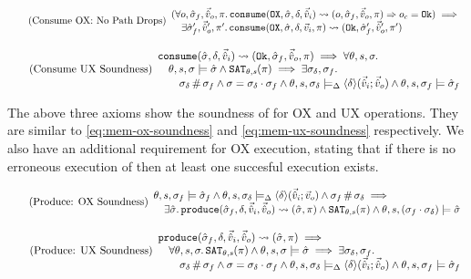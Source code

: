 \begin{equation}
\tag{Consume OX: No Path Drops}\label{eq:consume-ox-no-drop}
\begin{array}{l}
(\forall o, \hat{\sigma}_f,\vec{\hat{v}}_o,\pi \ldotp \texttt{consume}(\texttt{OX},\hat{\sigma},\delta,\vec{\hat{v}}_i)\rightsquigarrow (o, \hat{\sigma}_f, \vec{\hat{v}}_o, \pi)\Rightarrow o_c = \texttt{Ok}) \implies \\
\quad \exists  \hat{\sigma}_f',\vec{\hat{v}}_o',\pi' \ldotp \texttt{consume}(\texttt{OX}, \hat{\sigma}, \delta,\vec{v}_i,\pi)\rightsquigarrow (\texttt{Ok}, \hat{\sigma}_f', \vec{\hat{v}}_o', \pi')
\end{array}
\end{equation}

\begin{equation}
\tag{Consume UX Soundness}\label{eq:consume-ux-sound}
\begin{array}{l}
\texttt{consume}(\hat{\sigma},\delta,\vec{\hat{v}}_i)\rightsquigarrow (\texttt{Ok},\hat{\sigma}_f,\vec{\hat{v}}_o,\pi) \implies \forall \theta,s,\sigma\ldotp \\
\quad  \theta,s,\sigma\models \hat{\sigma} \land \texttt{SAT}_{\mathit{\theta,s}}(\pi) \implies \exists \sigma_\delta, \sigma_f\ldotp\\
\qquad \sigma_\delta\operatorname{\#}\sigma_f \land \sigma=\sigma_\delta\cdot\sigma_f \land \theta, s, \sigma_\delta \models_{\Delta} \left<\delta\right>\!(\vec{\hat{v}}_i;\vec{\hat{v}}_o) \land \theta,s,\sigma_f\models \hat{\sigma}_f
\end{array}
\end{equation}

The above three axioms show the soundness of \consume{} for OX and UX operations. They are similar to \ref{eq:mem-ox-soundness} and \ref{eq:mem-ux-soundness} respectively. We also have an additional requirement for OX execution, stating that if there is no erroneous execution of \consume{} then at least one succesful execution exists. 

\begin{equation}
\tag{Produce: OX Soundness}\label{eq:produce-ox-sound}
\begin{array}{l}
\theta, s, \sigma_f \models \hat{\sigma}_f \land \theta, s, \sigma_\delta \models_{\Delta} \left<\delta\right>\!(\vec{\hat{v}}_i;\vec{v}_o) \land \sigma_f\operatorname{\#}\sigma_\delta \implies \\
\quad \exists \hat{\sigma}\ldotp \texttt{produce}(\hat{\sigma}_f,\delta,\vec{\hat{v}}_i,\vec{\hat{v}}_o)\rightsquigarrow (\hat{\sigma},\pi) \land \texttt{SAT}_{\mathit{\theta,s}}(\pi) \land \theta,s,(\sigma_f\cdot\sigma_\delta) \models \hat{\sigma}
\end{array}
\end{equation}

\begin{equation}
\tag{Produce: UX Soundness}\label{eq:produce-ux-sound}
\begin{array}{l}
\texttt{produce}(\hat{\sigma}_f,\delta,\vec{\hat{v}}_i,\vec{\hat{v}}_o)\rightsquigarrow (\hat{\sigma}, \pi) \implies\\
\quad \forall\theta,s,\sigma\ldotp \texttt{SAT}_{\mathit{\theta,s}}(\pi) \land \theta,s,\sigma\models\hat{\sigma} \implies \exists \sigma_\delta, \sigma_f\ldotp \\
\qquad \sigma_\delta\operatorname{\#}\sigma_f \land \sigma=\sigma_\delta\cdot\sigma_f \land \theta,s,\sigma_\delta \models_{\Delta} \left<\delta\right>\!(\vec{\hat{v}}_i;\vec{\hat{v}}_o) \land \theta,s,\sigma_f \models \hat{\sigma}_f
\end{array}
\end{equation}

